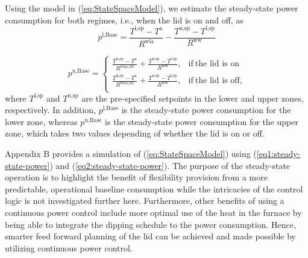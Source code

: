 \documentclass[conference]{IEEEtran}
\begin{document}
Using the model in (\ref{eq:StateSpaceModel}), we  estimate the steady-state power consumption for both regimes, i.e., when the lid is on and off, as
%
%
\begin{equation}\label{eq1:steady-state-power}
    p^{\text{l},\text{Base}} = \frac{T^{\text{l},\text{sp}} - T^{\text{a}}}{R^{\text{wla}}} - \frac{T^{\text{u},\text{sp}}-T^{\text{l},\text{sp}}}{R^{\text{ww}}}
\end{equation}

\begin{equation}\label{eq2:steady-state-power}
    p^{\text{u},\text{Base}}   =
    \begin{cases}
        \frac{T^{\text{u},\text{sp}} - T^{\text{a}}}{R^{\text{wua},\text{off}}}  + \frac{T^{\text{u},\text{sp}}-T^{\text{l},\text{sp}}}{R^{\text{ww}}}, & \text{if} \ \text{the lid is on}   \\
        \frac{T^{\text{u},\text{sp}} - T^{\text{a}}}{R^{\text{wua},\text{on}}} + \frac{T^{\text{u},\text{sp}}-T^{\text{l},\text{sp}}}{R^{\text{ww}}},   & \text{if} \ \text{the lid is off,} \\
    \end{cases}
\end{equation}
where $T^{\text{l},\text{sp}}$ and $T^{\text{u},\text{sp}}$ are the pre-specified setpoints in the lower and upper zones, respectively. In addition, $p^{\text{l},\text{Base}}$ is the steady-state power consumption for the lower zone, whereas $p^{\text{u},\text{Base}}$ is the steady-state power consumption for the upper zone, which takes two values depending of whether the lid is on or off.

Appendix B provides a simulation of (\ref{eq:StateSpaceModel}) using (\ref{eq1:steady-state-power}) and (\ref{eq2:steady-state-power}). The purpose of the steady-state operation is to highlight the benefit of flexibility provision from a more predictable, operational baseline consumption while the intricacies of the control logic is not investigated further here.
%
Furthermore, other benefits of using a  continuous power control include more optimal use of the heat in the furnace by being able to integrate the dipping schedule to the power consumption. Hence, smarter feed forward planning of the lid can be achieved and made possible by utilizing continuous power control.
\end{document}

